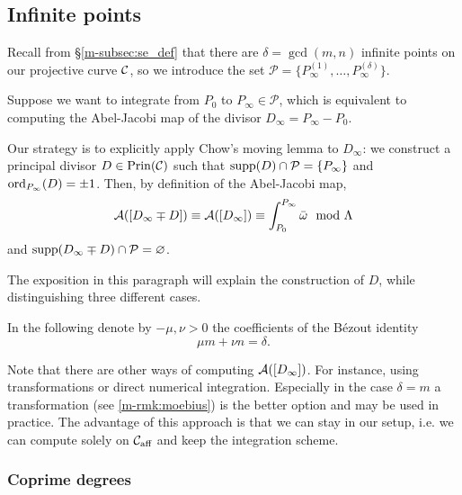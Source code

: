 \documentclass[main.tex]{subfiles}
\begin{document}
  \subsection{Infinite points}\label{subsec:ajm_infty}

  Recall from \S \ref{m-subsec:se_def} that there are $\delta = \gcd(m,n)$ infinite points on our projective curve $\mathcal{C}$, so
  we introduce the set $\mathcal{P}
  = \{ P_{\infty}^{(1)},\dots, P_{\infty}^{(\delta)} \}$.


  Suppose we want to integrate from $P_0$ to $P_{\infty} \in \mathcal{P}$, which is equivalent to computing the Abel-Jacobi map of the divisor
  $D_{\infty} = P_{\infty} - P_0$.

  Our strategy is to explicitly apply Chow's moving lemma to $D_{\infty}$: we construct a principal divisor $D \in \operatorname{Prin}(\mathcal{C})$ such that $\operatorname{supp}(D) \cap \mathcal{P} = \{ P_{\infty} \}$
  and $\operatorname{ord}_{P_{\infty}}(D) = \pm 1$. Then, by definition of the Abel-Jacobi map,
  \begin{equation*}
  \mathcal{A}([D_{\infty} \mp D]) \equiv \mathcal{A}([D_{\infty}]) \equiv \int_{P_0}^{P_{\infty}} \bar{\omega} \mod \Lambda
  \end{equation*}
  and $\operatorname{supp}(D_{\infty} \mp D) \cap \mathcal{P} = \varnothing$.

  The exposition in this paragraph will explain the construction of $D$, while distinguishing three different cases.

  In the following denote by  $-\mu,\nu > 0$ the coefficients of the Bézout identity
  \begin{equation*}
    \mu m + \nu n = \delta.
  \end{equation*}

  \begin{rmk}
   Note that there are other ways of computing $\mathcal{A}([D_{\infty}])$. For instance, using transformations or direct numerical
   integration. Especially in the case $\delta = m$ a transformation (see \ref{m-rmk:moebius}) is the better option and may be used in practice.
   The advantage of this approach is that we can stay in our setup, i.e. we can compute solely on $\mathcal{C}_{\text{aff}}$ and
   keep the integration scheme.
  \end{rmk}



  \subsubsection{Coprime degrees}\label{subsec:ajm_inf_cop}
\end{document}
